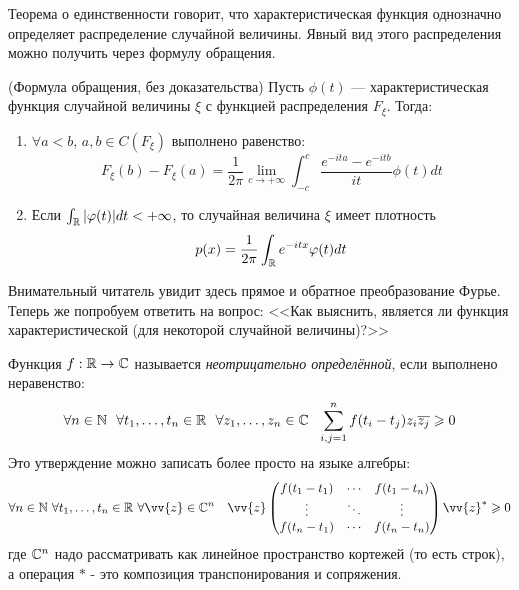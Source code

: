 \begin{note}
    Теорема о единственности говорит, что характеристическая функция однозначно определяет распределение случайной величины. Явный вид этого распределения можно получить через формулу обращения.
\end{note}

\begin{theorem} (Формула обращения, без доказательства)
    Пусть $\phi(t)$ --- характеристическая функция случайной величины $\xi$ с функцией распределения $F_\xi$. Тогда:
    \begin{enumerate}
        \item $\forall a < b$, $a, b \in C(F_\xi)$ выполнено равенство:
        \[
            F_\xi(b) - F_\xi(a) = \frac{1}{2\pi} \lim_{c \to +\infty} \int_{-c}^{c}
            \frac{e^{-ita} - e^{-itb}}{it} \phi(t) dt
        \]
        \item Если $\int_{\mathbb{R}} |\varphi(t)| dt < +\infty$, то случайная величина $\xi$ имеет плотность
        \[
            p(x) = \frac{1}{2\pi} \int_{\mathbb{R}} e^{-itx} \varphi(t) dt
        \]
    \end{enumerate}
\end{theorem}

\begin{note}
    Внимательный читатель увидит здесь прямое и обратное преобразование Фурье. Теперь же попробуем ответить на вопрос: <<Как выяснить, является ли функция характеристической (для некоторой случайной величины)?>>
\end{note}

\begin{definition}
    Функция $f: \mathbb{R} \to \mathbb{C}$ называется \textit{неотрицательно определённой}, если выполнено неравенство:
    \[
        \forall n \in \mathbb{N} \ \ \forall t_1, \ldots, t_n \in \mathbb{R} \ \ \forall z_1, \ldots, z_n \in \mathbb{C} \ \
        \sum_{i, j = 1}^n f(t_i - t_j) z_i \overline{z_j} \geqslant 0
    \]
    Это утверждение можно записать более просто на языке алгебры:
    \[
    	\forall n \in \N\ \forall t_1, \ldots, t_n \in \R\ \forall \vv{z} \in \Cm^n \quad \vv{z} \Matrix{
    		f(t_1 - t_1) & \cdots & f(t_1 - t_n) \\
   			\vdots & \ddots & \vdots \\
   			f(t_n - t_1) & \cdots & f(t_n - t_n)
   		}
   		\vv{z}^* \ge 0
    \]
    где $\mathbb{C}^n$ надо рассматривать как линейное пространство кортежей (то есть строк), а операция $*$ - это композиция транспонирования и сопряжения.
\end{definition}

